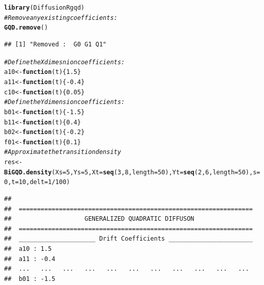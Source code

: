 \documentclass[a4paper,11pt]{article}\usepackage[]{graphicx}\usepackage[]{color}
\makeatletter
\newcommand{\hlnum}[1]{\textcolor[rgb]{0.686,0.059,0.569}{#1}}%
\newcommand{\hlcom}[1]{\textcolor[rgb]{0.678,0.584,0.686}{\textit{#1}}}%
\newcommand{\hlopt}[1]{\textcolor[rgb]{0,0,0}{#1}}%
\newcommand{\hlstd}[1]{\textcolor[rgb]{0.345,0.345,0.345}{#1}}%
\newcommand{\hlkwa}[1]{\textcolor[rgb]{0.161,0.373,0.58}{\textbf{#1}}}%
\newcommand{\hlkwb}[1]{\textcolor[rgb]{0.69,0.353,0.396}{#1}}%
\newcommand{\hlkwc}[1]{\textcolor[rgb]{0.333,0.667,0.333}{#1}}%
\newcommand{\hlkwd}[1]{\textcolor[rgb]{0.737,0.353,0.396}{\textbf{#1}}}%
\newenvironment{kframe}{%
 \def\at@end@of@kframe{}%
 \ifinner\ifhmode%
  \def\at@end@of@kframe{\end{minipage}}%
  \begin{minipage}{\columnwidth}%
 \fi\fi%
 \def\FrameCommand##1{\hskip\@totalleftmargin \hskip-\fboxsep
 \colorbox{shadecolor}{##1}\hskip-\fboxsep
     \hskip-\linewidth \hskip-\@totalleftmargin \hskip\columnwidth}%
 \MakeFramed {\advance\hsize-\width
   \@totalleftmargin\z@ \linewidth\hsize
   \@setminipage}}%
 {\par\unskip\endMakeFramed%
 \at@end@of@kframe}
\newenvironment{knitrout}{}{} %
\makeatother
\begin{document}
\begin{knitrout}
\color{fgcolor}\begin{kframe}
\begin{alltt}
\hlkwd{library}\hlstd{(DiffusionRgqd)}
\hlcom{# Remove any existing coefficients:}
\hlkwd{GQD.remove}\hlstd{()}
\end{alltt}
\begin{verbatim}
## [1] "Removed :  G0 G1 Q1"
\end{verbatim}
\begin{alltt}
\hlcom{# Define the X dimesnion coefficients:}
\hlstd{a10} \hlkwb{<-} \hlkwa{function}\hlstd{(}\hlkwc{t}\hlstd{)\{}\hlnum{1.5}\hlstd{\}}
\hlstd{a11} \hlkwb{<-} \hlkwa{function}\hlstd{(}\hlkwc{t}\hlstd{)\{}\hlopt{-}\hlnum{0.4}\hlstd{\}}
\hlstd{c10} \hlkwb{<-} \hlkwa{function}\hlstd{(}\hlkwc{t}\hlstd{)\{}\hlnum{0.05}\hlstd{\}}
\hlcom{# Define the Y dimension coefficients:}
\hlstd{b01} \hlkwb{<-} \hlkwa{function}\hlstd{(}\hlkwc{t}\hlstd{)\{}\hlopt{-}\hlnum{1.5}\hlstd{\}}
\hlstd{b11} \hlkwb{<-} \hlkwa{function}\hlstd{(}\hlkwc{t}\hlstd{)\{}\hlnum{0.4}\hlstd{\}}
\hlstd{b02} \hlkwb{<-} \hlkwa{function}\hlstd{(}\hlkwc{t}\hlstd{)\{}\hlopt{-}\hlnum{0.2}\hlstd{\}}
\hlstd{f01} \hlkwb{<-} \hlkwa{function}\hlstd{(}\hlkwc{t}\hlstd{)\{}\hlnum{0.1}\hlstd{\}}
\hlcom{# Approximate the transition density}
\hlstd{res} \hlkwb{<-} \hlkwd{BiGQD.density}\hlstd{(}\hlkwc{Xs} \hlstd{=} \hlnum{5}\hlstd{,} \hlkwc{Ys} \hlstd{=} \hlnum{5}\hlstd{,} \hlkwc{Xt} \hlstd{=} \hlkwd{seq}\hlstd{(}\hlnum{3}\hlstd{,} \hlnum{8}\hlstd{,} \hlkwc{length} \hlstd{=} \hlnum{50}\hlstd{),} \hlkwc{Yt} \hlstd{=} \hlkwd{seq}\hlstd{(}\hlnum{2}\hlstd{,} \hlnum{6}\hlstd{,} \hlkwc{length} \hlstd{=} \hlnum{50}\hlstd{),} \hlkwc{s} \hlstd{=} \hlnum{0}\hlstd{,} \hlkwc{t} \hlstd{=} \hlnum{10}\hlstd{,} \hlkwc{delt} \hlstd{=} \hlnum{1}\hlopt{/}\hlnum{100}\hlstd{)}
\end{alltt}
\begin{verbatim}
##                                                                  
##  ================================================================
##                    GENERALIZED QUADRATIC DIFFUSON                
##  ================================================================
##  _____________________ Drift Coefficients _______________________
##  a10 : 1.5                                                       
##  a11 : -0.4                                                      
##  ...   ...   ...   ...   ...   ...   ...   ...   ...   ...   ... 
##  b01 : -1.5                                                      

\end{verbatim}
\end{kframe}
\end{knitrout}
\end{document}
